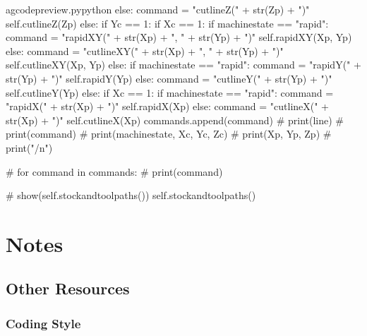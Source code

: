 \documentclass{ltxdoc}
\begin{document}
\begin{writecode}{a}{gcodepreview.py}{python}
                            else: 
                                command = "cutlineZ(" + str(Zp) + ")"
                                self.cutlineZ(Zp)
                else:
                    if Yc == 1:
                        if Xc == 1:
                            if machinestate == "rapid":
                                command = "rapidXY(" + str(Xp) + ", " + str(Yp) + ")"
                                self.rapidXY(Xp, Yp)
                            else: 
                                command = "cutlineXY(" + str(Xp) + ", " + str(Yp) + ")"
                                self.cutlineXY(Xp, Yp)
                        else:
                            if machinestate == "rapid":
                                command = "rapidY(" + str(Yp) + ")"
                                self.rapidY(Yp)
                            else: 
                                command = "cutlineY(" + str(Yp) + ")"
                                self.cutlineY(Yp)
                    else:
                        if Xc == 1:
                            if machinestate == "rapid":
                                command = "rapidX(" + str(Xp) + ")"
                                self.rapidX(Xp)
                            else: 
                                command = "cutlineX(" + str(Xp) + ")"
                                self.cutlineX(Xp)
                commands.append(command)
#                print(line)
#                print(command)
#                print(machinestate, Xc, Yc, Zc)
#                print(Xp, Yp, Zp)
#                print("/n")

#        for command in commands:
#            print(command)

#        show(self.stockandtoolpaths())
        self.stockandtoolpaths()

\end{writecode}
\addtocounter{gcpy}{108}

\section{Notes}

\subsection{Other Resources}

\subsubsection{Coding Style}
\end{document}
